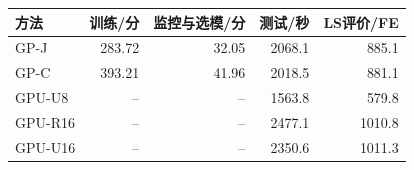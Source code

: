 \begin{tabular}{@{}lrrrr@{}}
\toprule
方法 & 训练/分 & 监控与选模/分 & 测试/秒 & LS评价/FE \\ \midrule
GP-J & 283.72 & 32.05 & 2068.1 & 885.1 \\
GP-C & 393.21 & 41.96 & 2018.5 & 881.1 \\
GPU-U8 & -- & -- & 1563.8 & 579.8 \\
GPU-R16 & -- & -- & 2477.1 & 1010.8 \\
GPU-U16 & -- & -- & 2350.6 & 1011.3 \\
\bottomrule
\end{tabular}
